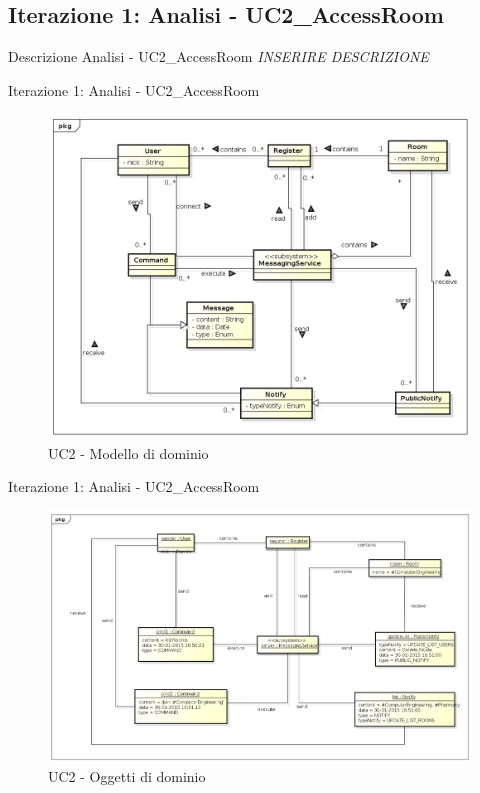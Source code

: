 \documentclass[t]{beamer} %
\begin{document}
\subsection{Iterazione 1: Analisi - UC2\_AccessRoom}
\begin{frame} {Descrizione Analisi - UC2\_AccessRoom}
 \emph{INSERIRE DESCRIZIONE}
\end{frame}

\begin{frame} {Iterazione 1: Analisi - UC2\_AccessRoom}
   \begin{figure}
     \includegraphics[scale=0.29]{image_astah/Iteration_1_DomainModel/UC2_AccessRoom_DM.png}{\centering}
     \caption{UC2 - Modello di dominio}
     \label{fig_UC2_AR_DM} 
   \end{figure}
\end{frame}

\begin{frame} {Iterazione 1: Analisi - UC2\_AccessRoom}
   \begin{figure}
     \includegraphics[scale=0.26]{image_astah/Iteration_1_DomainModel/UC2_AccessRoom_OM}{\centering}
     \caption{UC2 - Oggetti di dominio}
     \label{fig_UC2_AR_OM} 
   \end{figure}
\end{frame}
\end{document}

